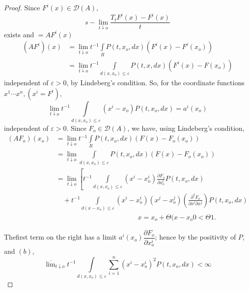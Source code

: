 \begin{proof}
 Since $F^i (x) \in \mathscr{D} (A)$,
 $$
 s-\lim_{t \downarrow o} \frac{T_t F^i (x) - F^i (x)}{t}
 $$
 exists and $= A F^i (x)$
 \begin{align*}
  (A F^i) (x) & = \lim_{t \downarrow o} t^{-1} \int\limits_R P(t, x_o,
  dx) (F^i (x) - F^i (x_o))\\ 
  & = \lim_{t \downarrow o} t^{-1} \int\limits_{d (x, x_o) \le
   \varepsilon} P(t, x, dx) (F^i (x) - F (x_o)) 
 \end{align*}
 independent of $\varepsilon > 0$, by Lindeberg's
 condition. So, for the coordinate functions $x^1 \cdots x^n, (x^i =
 F^i)$, 
 $$
 \lim_{t \downarrow o} t^{-1} \int\limits_{d (x, x_o)\le \varepsilon}
 (x^i - x_o ) P(t, x_o, dx) = a^i (x_o) 
 $$
 independent of $\varepsilon > 0$. Since $F_o \in \mathscr{D} (A)$, we
 have, using Lindeberg's condition, 
 \begin{align*}
  (A F_o) (x_o) & = \lim_{t \downarrow o} t^{-1} \int\limits_{R} P(t,
  x_o, dx) (F (x) - F_o (x_o))\\ 
  & = \lim_{t \downarrow o} \int\limits_{d (x, x_o) \le \varepsilon}
  P(t, x_o, dx) (F (x) - F_o (x_o ))\\ 
  & = \lim_{t \downarrow o} \left[ t^{-1} \int\limits_{d(x, x_o) \le
   \varepsilon} (x^i - x^i_o) \frac{\partial F_o}{\partial x^i_o}
  P(t, x_o, dx)\right. \\ 
  & \quad + t^{-1} \int\limits_{d(x-x_o) \le \varepsilon} (x^i - x^i_o) (x^j
  - x^j_o) \left( \frac{\partial^2 F_o}{\partial x^i \partial x^j}
  \right) P(t, x_o, dx) \\ 
  & \hspace{5cm} x= x_o + \Theta (x - x_o 0 < \Theta 1. 
 \end{align*}
 
 The\pageoriginale first term on the right has a limit $a^i (x_o) \dfrac{\partial
  F_o}{\partial x^i_o}$; hence by the positivity of $P$, and $(b)$, 
 \begin{equation}
  \overline{\lim}_{t \downarrow o} t^{-1} \int\limits_{d(x, x_o) \le
   \varepsilon} \sum_{i = 1}^n (x^i - x^i_o)^2 P(t, x_o, dx) <
  \infty \tag{*} 
 \end{equation}
 

\end{proof}
